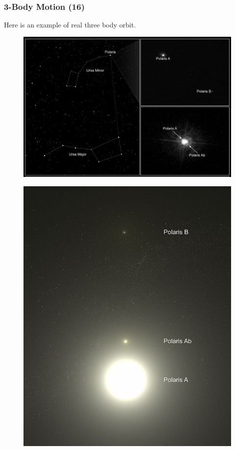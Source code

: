 \documentclass{beamer}
\begin{document}
\begin{frame}
\frametitle{3-Body Motion (16)}
Here is an example of real three body orbit.
\begin{multicols}{2}
\begin{figure}
\begin{center}
\includegraphics[width=1.0\linewidth]{PolarisA.jpg}
\end{center}
\end{figure}
\begin{figure}
\begin{center}
\includegraphics[width=1.0\linewidth]{PolarisB.jpg}
\end{center}
\end{figure}
\end{multicols}
\end{frame}
\end{document}
